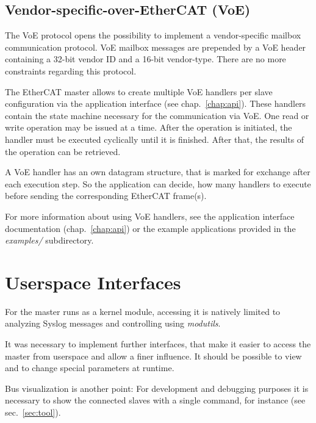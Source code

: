 \documentclass[a4paper,12pt,BCOR6mm,bibtotoc,idxtotoc]{scrbook}
\begin{document}

\section{Vendor-specific-over-EtherCAT (VoE)}
\label{sec:voe}

The VoE protocol opens the possibility to implement a vendor-specific mailbox
communication protocol. VoE mailbox messages are prepended by a VoE header
containing a 32-bit vendor ID and a 16-bit vendor-type. There are no more
constraints regarding this protocol.

The EtherCAT master allows to create multiple VoE handlers per slave
configuration via the application interface (see chap.~\ref{chap:api}). These
handlers contain the state machine necessary for the communication via VoE.
One read or write operation may be issued at a time. After the operation is
initiated, the handler must be executed cyclically until it is finished. After
that, the results of the operation can be retrieved.

A VoE handler has an own datagram structure, that is marked for exchange after
each execution step. So the application can decide, how many handlers to
execute before sending the corresponding EtherCAT frame(s).

For more information about using VoE handlers, see the application interface
documentation (chap.~\ref{chap:api}) or the example applications provided in
the \textit{examples/} subdirectory.


\chapter{Userspace Interfaces}
\label{sec:user}

For the master runs as a kernel module, accessing it is natively limited to
analyzing Syslog messages and controlling using \textit{modutils}.

It was necessary to implement further interfaces, that make it easier to access
the master from userspace and allow a finer influence. It should be possible
to view and to change special parameters at runtime.

Bus visualization is another point: For development and debugging purposes it
is necessary to show the connected slaves with a single command, for instance
(see sec.~\ref{sec:tool}).
\end{document}
